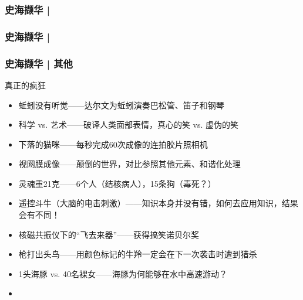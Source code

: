 % 
\begin{frame}
  \frametitle{史海撷华 | }
\end{frame}

% 
\begin{frame}
  \frametitle{史海撷华 | }
\end{frame}

\begin{frame}
  \frametitle{史海撷华 | 其他}
  \begin{block}{真正的疯狂}
    \begin{itemize}
      \item 蚯蚓没有听觉——达尔文为蚯蚓演奏巴松管、笛子和钢琴
      \item 科学 vs. 艺术——破译人类面部表情，真心的笑 vs. 虚伪的笑
      \item 下落的猫咪——每秒完成60次成像的连拍胶片照相机
      \item 视网膜成像——颠倒的世界，对比参照其他元素、和谐化处理
      \item 灵魂重21克——6个人（结核病人），15条狗（毒死？）
      \item 遥控斗牛（大脑的电击刺激）——知识本身并没有错，如何去应用知识，结果会有不同！
      \item 核磁共振仪下的“飞去来器”——获得搞笑诺贝尔奖
      \item 枪打出头鸟——用颜色标记的牛羚一定会在下一次袭击时遭到猎杀
      \item 1头海豚 vs. 40名裸女——海豚为何能够在水中高速游动？
      \item 
    \end{itemize}
  \end{block}
\end{frame}



